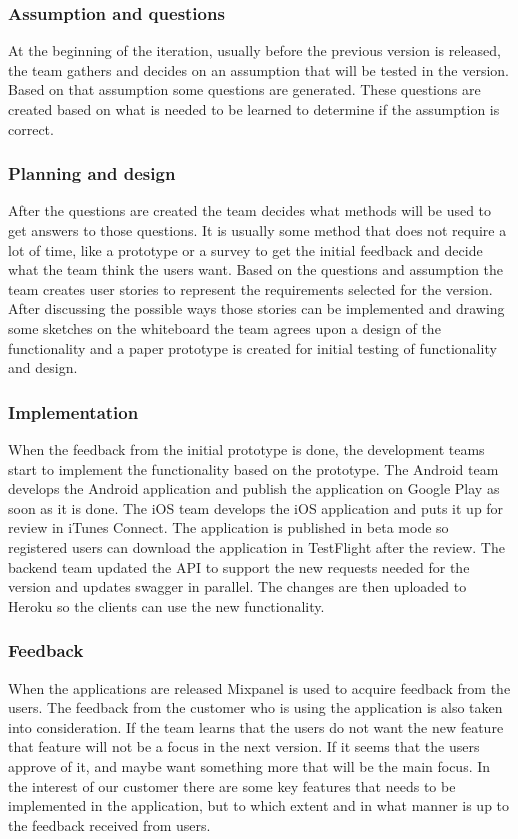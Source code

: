 \subsubsection{Assumption and questions}
At the beginning of the iteration, usually before the previous version is released, the team gathers and decides on an assumption that will be tested in the version. Based on that assumption some questions are generated. These questions are created based on what is needed to be learned to determine if the assumption is correct. 

\subsubsection{Planning and design}
After the questions are created the team decides what methods will be used to get answers to those questions. It is usually some method that does not require a lot of time, like a prototype or a survey to get the initial feedback and decide what the team think the users want. Based on the questions and assumption the team creates user stories to represent the requirements selected for the version.
After discussing the possible ways those stories can be implemented and drawing some sketches on the whiteboard the team agrees upon a design of the functionality and a paper prototype is created for initial testing of functionality and design. 

\subsubsection{Implementation}
When the feedback from the initial prototype is done, the development teams start to implement the functionality based on the prototype. The Android team develops the Android application and publish the application on Google Play as soon as it is done. The iOS team develops the iOS application and puts it up for review in iTunes Connect.
The application is published in beta mode so registered users can download the application in TestFlight after the review. The backend team updated the API to support the new requests needed for the version and updates swagger in parallel. The changes are then uploaded to Heroku so the clients can use the new functionality. 

\subsubsection{Feedback}
When the applications are released Mixpanel is used to acquire feedback from the users. The feedback from the customer who is using the application is also taken into consideration. If the team learns that the users do not want the new feature that feature will not be a focus in the next version. If it seems that the users approve of it, and maybe want something more that will be the main focus. In the interest of our customer there are some key features that needs to be implemented in the application, but to which extent and in what manner is up to the feedback received from users.


